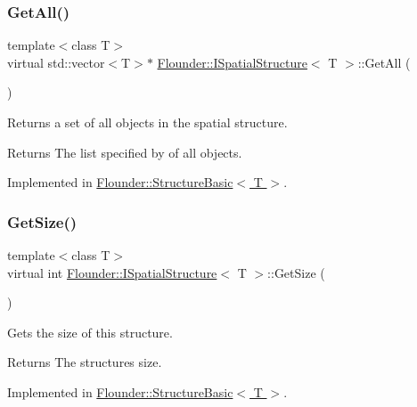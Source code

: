 \subsubsection{\texorpdfstring{Get\+All()}{GetAll()}}
{\footnotesize\ttfamily template$<$class T$>$ \\
virtual std\+::vector$<$T$>$$\ast$ \hyperlink{class_flounder_1_1_i_spatial_structure}{Flounder\+::\+I\+Spatial\+Structure}$<$ T $>$\+::Get\+All (\begin{DoxyParamCaption}{ }\end{DoxyParamCaption})\hspace{0.3cm}{\ttfamily [pure virtual]}}



Returns a set of all objects in the spatial structure. 

\begin{DoxyReturn}{Returns}
The list specified by of all objects. 
\end{DoxyReturn}


Implemented in \hyperlink{class_flounder_1_1_structure_basic_ab4d0ecf6a9efeb993af50fa77b4b27d1}{Flounder\+::\+Structure\+Basic$<$ T $>$}.

\mbox{\label{class_flounder_1_1_i_spatial_structure_ab638001c851bd7cf2525035ffa21b8b4}} 
\subsubsection{\texorpdfstring{Get\+Size()}{GetSize()}}
{\footnotesize\ttfamily template$<$class T$>$ \\
virtual int \hyperlink{class_flounder_1_1_i_spatial_structure}{Flounder\+::\+I\+Spatial\+Structure}$<$ T $>$\+::Get\+Size (\begin{DoxyParamCaption}{ }\end{DoxyParamCaption})\hspace{0.3cm}{\ttfamily [pure virtual]}}



Gets the size of this structure. 

\begin{DoxyReturn}{Returns}
The structures size. 
\end{DoxyReturn}


Implemented in \hyperlink{class_flounder_1_1_structure_basic_a4e7c03380511e986ba879f0c953b3993}{Flounder\+::\+Structure\+Basic$<$ T $>$}.

